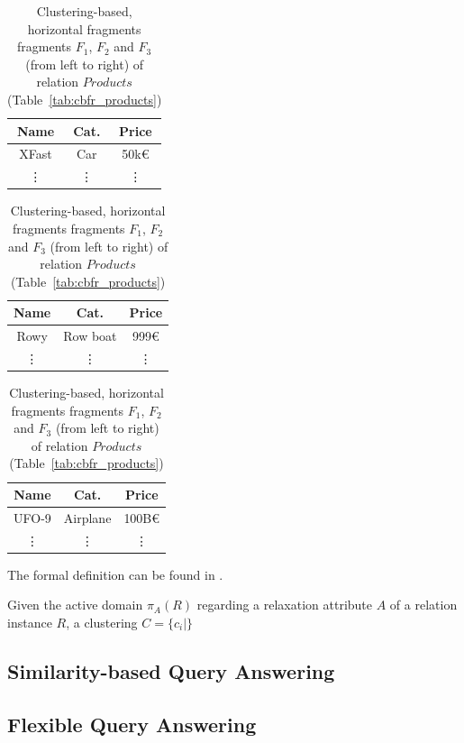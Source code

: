 \begin{exmp}
\begin{table}[h]
    \hspace*{\fill}
    \begin{tabular}{|c|c|c|}
        \hline
        Name & Cat. & Price \\
        \hline
        XFast & Car & 50k€ \\
        \vdots & \vdots & \vdots \\
        \hline
    \end{tabular}
    \hfill
    \begin{tabular}{|c|c|c|}
        \hline
        Name & Cat. & Price\\
        \hline
        Rowy & Row boat & 999€ \\
        \vdots & \vdots & \vdots \\
        \hline
    \end{tabular}
    \hfill
    \begin{tabular}{|c|c|c|}
        \hline
        Name & Cat. & Price\\
        \hline
        UFO-9 & Airplane & 100B€ \\
        \vdots & \vdots & \vdots \\
        \hline
    \end{tabular}
    \hspace*{\fill}
    \caption{Clustering-based, horizontal fragments fragments $F_1$, $F_2$ and $F_3$ (from left to right) of relation $Products$ 
            (Table~\ref{tab:cbfr_products})}
    \label{tab:cbfr_frags}
\end{table}

\end{exmp}



The formal definition can be found in \cite{Wiese2014}.





\begin{definition}
Given the active domain $\pi_A(R)$ regarding a relaxation attribute $A$ of a relation instance $R$, a clustering $C=\{c_i|\}$
\end{definition}


\subsection{Similarity-based Query Answering}
\label{sec:meth_sbqa}


\subsection{Flexible Query Answering}
\label{sec:meth_fqa}